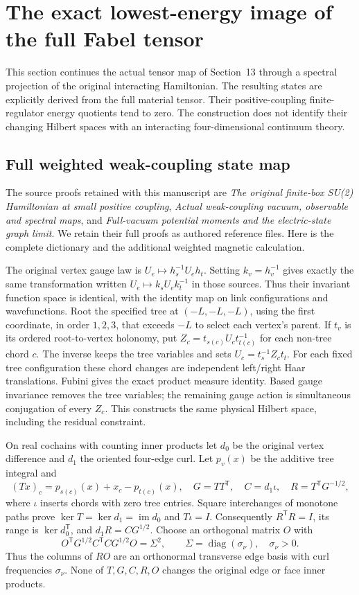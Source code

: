 \documentclass[11pt]{article}
\begin{document}
\section{The exact lowest-energy image of the full Fabel tensor}
\label{sec:fabel-low}

This section continues the actual tensor map of Section~13 through a
spectral projection of the original interacting Hamiltonian. The resulting
states are explicitly derived from the full material tensor. Their
positive-coupling finite-regulator energy quotients tend to zero.
The construction does not identify their changing Hilbert spaces with an
interacting four-dimensional continuum theory.

\subsection{Full weighted weak-coupling state map}

The source proofs retained with this manuscript are \emph{The original
finite-box SU(2) Hamiltonian at small positive coupling},
\emph{Actual weak-coupling vacuum, observable and spectral maps}, and
\emph{Full-vacuum potential moments and the electric-state graph limit}.
We retain their full proofs as authored reference files. Here is the
complete dictionary and the additional weighted magnetic calculation.

The original vertex gauge law is $U_e\mapsto h_s^{-1}U_eh_t$. Setting
$k_v=h_v^{-1}$ gives exactly the same transformation written
$U_e\mapsto k_sU_ek_t^{-1}$ in those sources. Thus their invariant function
space is identical, with the identity map on link configurations and
wavefunctions. Root the specified tree at $(-L,-L,-L)$, using the first
coordinate, in order $1,2,3$, that exceeds $-L$ to select each vertex's
parent. If $t_v$ is its ordered root-to-vertex holonomy, put
$Z_c=t_{s(c)}U_ct_{t(c)}^{-1}$ for each non-tree chord $c$.
The inverse keeps the tree variables and sets $U_c=t_s^{-1}Z_ct_t$.
For each fixed tree configuration these chord changes are independent
left/right Haar translations. Fubini gives the exact product measure
identity. Based gauge invariance removes the tree variables; the
remaining gauge action is simultaneous conjugation of every $Z_c$.
This constructs the same physical Hilbert space, including the residual
constraint.

On real cochains with counting inner products let $d_0$ be the original
vertex difference and $d_1$ the oriented four-edge curl. Let $p_v(x)$
be the additive tree integral and
\[
 (Tx)_c=p_{s(c)}(x)+x_c-p_{t(c)}(x),\quad
 G=TT^{\mathsf T},\quad C=d_1\iota,\quad
 R=T^{\mathsf T}G^{-1/2},
\]
where $\iota$ inserts chords with zero tree entries.
Square interchanges of monotone paths prove
$\ker T=\ker d_1=\operatorname{im}d_0$ and $T\iota=I$.
Consequently $R^{\mathsf T}R=I$, its range is
$\ker d_0^{\mathsf T}$, and $d_1R=CG^{1/2}$.
Choose an orthogonal matrix $O$ with
\[
 O^{\mathsf T}G^{1/2}C^{\mathsf T}CG^{1/2}O=\Sigma^2,\qquad
 \Sigma=\operatorname{diag}(\sigma_\nu),\quad \sigma_\nu>0.
\]
Thus the columns of $RO$ are an orthonormal transverse edge basis
with curl frequencies $\sigma_\nu$. None of $T,G,C,R,O$ changes
the original edge or face inner products.
\end{document}
